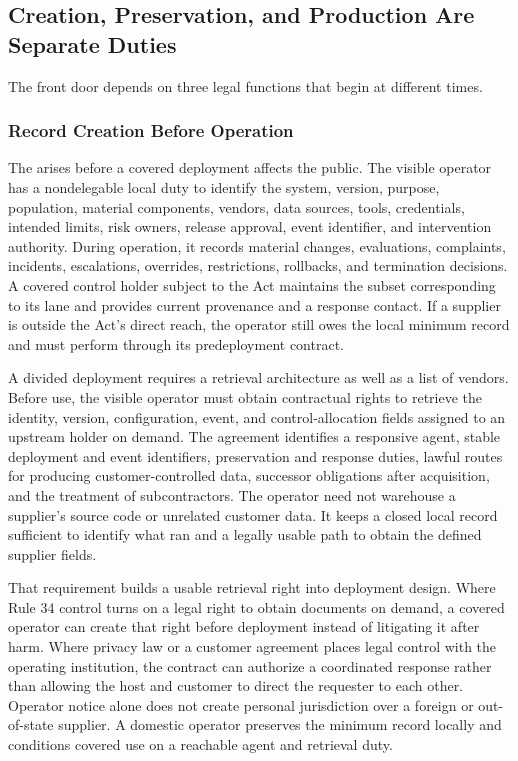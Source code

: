 \subsection{Creation, Preservation, and Production Are Separate Duties}
\label{sec:three-duties}

The front door depends on three legal functions that begin at different times.

\subsubsection{Record Creation Before Operation}

The  arises before a covered deployment affects the public. The visible operator has a nondelegable local duty to identify the system, version, purpose, population, material components, vendors, data sources, tools, credentials, intended limits, risk owners, release approval, event identifier, and intervention authority. During operation, it records material changes, evaluations, complaints, incidents, escalations, overrides, restrictions, rollbacks, and termination decisions. A covered control holder subject to the Act maintains the subset corresponding to its lane and provides current provenance and a response contact. If a supplier is outside the Act's direct reach, the operator still owes the local minimum record and must perform through its predeployment contract.

A divided deployment requires a retrieval architecture as well as a list of vendors. Before use, the visible operator must obtain contractual rights to retrieve the identity, version, configuration, event, and control-allocation fields assigned to an upstream holder on demand. The agreement identifies a responsive agent, stable deployment and event identifiers, preservation and response duties, lawful routes for producing customer-controlled data, successor obligations after acquisition, and the treatment of subcontractors. The operator need not warehouse a supplier's source code or unrelated customer data. It keeps a closed local record sufficient to identify what ran and a legally usable path to obtain the defined supplier fields.

That requirement builds a usable retrieval right into deployment design. Where Rule 34 control turns on a legal right to obtain documents on demand, a covered operator can create that right before deployment instead of litigating it after harm. Where privacy law or a customer agreement places legal control with the operating institution, the contract can authorize a coordinated response rather than allowing the host and customer to direct the requester to each other. Operator notice alone does not create personal jurisdiction over a foreign or out-of-state supplier. A domestic operator preserves the minimum record locally and conditions covered use on a reachable agent and retrieval duty.

